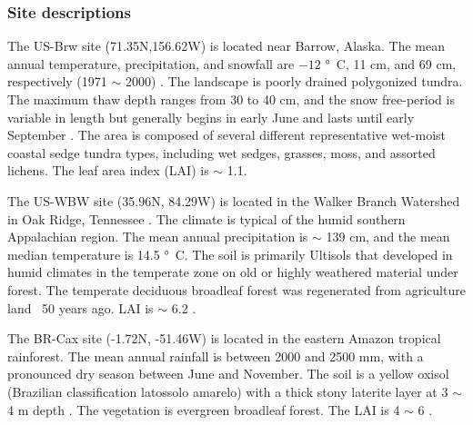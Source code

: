 \documentclass[gmd, manuscript]{copernicus}
\begin{document}
\subsubsection{Site descriptions}
The US-Brw site (71.35N,156.62W) is located near Barrow, Alaska. The mean annual
temperature, precipitation, and snowfall are $-12$ \unit{\degree C}, 11 cm, and
69 cm, respectively (1971 $\sim$ 2000) \citep{Lara2012}. The landscape is poorly
drained polygonized tundra. The maximum thaw depth ranges from 30 to 40 cm, and the
snow free-period is variable in length but generally begins in early June and
lasts until early September \citep{Hinkel2003}. The area is composed of several
different representative wet-moist coastal sedge tundra types, including wet
sedges, grasses, moss, and assorted lichens. The leaf area index (LAI) is
$\sim$ 1.1.

The US-WBW site (35.96N, 84.29W) is located in the Walker Branch Watershed in
Oak Ridge, Tennessee \citep{Hanson2003}. The climate is typical of the humid
southern Appalachian region. The mean annual precipitation is $\sim$ 139 cm, and
the mean median temperature is 14.5 \unit{\degree C}.  
The soil is primarily Ultisols that developed in humid climates in the
temperate zone on old or highly weathered material under forest. The temperate
deciduous broadleaf forest was regenerated from agriculture land ~50 years ago.
LAI is $\sim$ 6.2 \citep{Hanson2004}. %

The BR-Cax site (-1.72N, -51.46W) is located in the eastern Amazon tropical
rainforest. The mean annual rainfall is between 2000 and 2500 \unit{mm}, with a
pronounced dry season between June and November. The soil is a yellow oxisol
(Brazilian classification latossolo amarelo) with a thick stony laterite layer
at 3 $\sim$ 4 m depth \citep{daCosta2010}. The vegetation is evergreen
broadleaf forest. The LAI is 4 $\sim$ 6 \citep{Powell2013}. 
\end{document}
